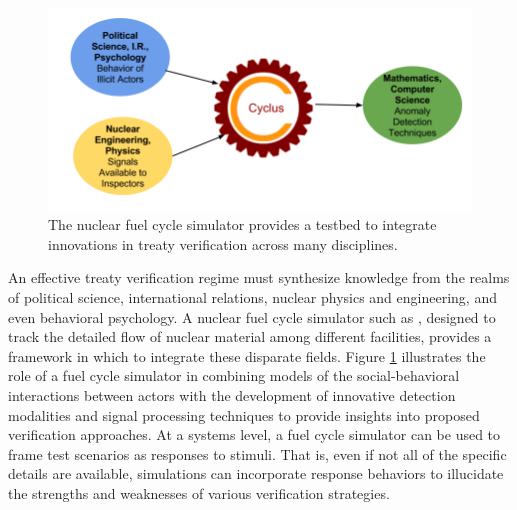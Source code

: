 \begin{figure}%
\begin{center}
\includegraphics[natwidth=162bp,natheight=227bp, scale=0.5]{./figs/cyclus_interdiscipline.png}
\end{center}
\caption{The \Cyclus nuclear fuel cycle simulator provides a testbed to integrate innovations in treaty verification across many disciplines.}
\label{fig:cyclus_diagram}
\end{figure}

An effective treaty verification regime must synthesize knowledge from the realms of political science, international relations, nuclear physics and engineering, and even behavioral psychology.  A nuclear fuel cycle simulator such as \Cyclus, designed to track the detailed flow of nuclear material among different facilities, provides a framework in which to integrate these disparate fields.  Figure \ref{fig:cyclus_diagram} illustrates  the role of a fuel cycle simulator in combining models of the social-behavioral interactions between actors with the development of innovative detection modalities and signal processing techniques to provide insights into proposed verification approaches.  At a systems level, a fuel cycle simulator can be used to frame test scenarios as responses to stimuli. That is, even if not all of the specific details are available, simulations can incorporate response behaviors to illucidate the strengths and weaknesses of various verification strategies.



